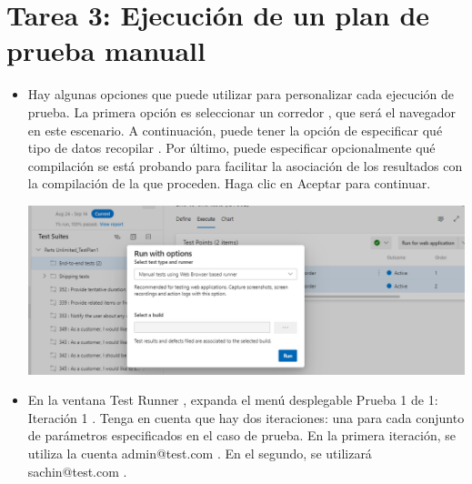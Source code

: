 \section{Tarea 3: Ejecución de un plan de prueba manuall } 
\begin{itemize}
\item Hay algunas opciones que puede utilizar para personalizar cada ejecución de prueba. La primera opción es seleccionar un corredor , que será el navegador en este escenario. A continuación, puede tener la opción de especificar qué tipo de datos recopilar . Por último, puede especificar opcionalmente qué compilación se está probando para facilitar la asociación de los resultados con la compilación de la que proceden. Haga clic en Aceptar para continuar.
\begin{center}
\includegraphics[width=\columnwidth]{images/40}\newline
\end{center} 
\item En la ventana Test Runner , expanda el menú desplegable Prueba 1 de 1: Iteración 1 . Tenga en cuenta que hay dos iteraciones: una para cada conjunto de parámetros especificados en el caso de prueba. En la primera iteración, se utiliza la cuenta admin@test.com . En el segundo, se utilizará sachin@test.com .
\begin{center}

\end{center}
\end{itemize}

